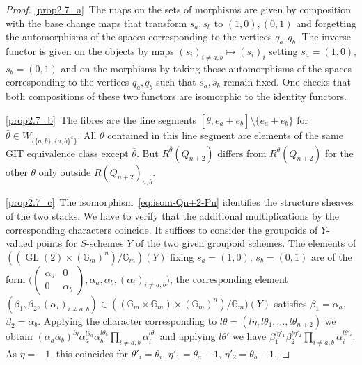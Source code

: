 \documentclass[10pt,a4paper]{amsart}
\theoremstyle{definition}
\def\G{\mathds G}
\DeclareMathOperator{\GL}{GL}
\begin{document}
\begin{proof}
\ref{prop2.7_a}~The maps on the sets of morphisms are given by
composition with the base change maps that transform $s_a,s_b$ to $(1,0),(0,1)$
and forgetting the automorphisms of the spaces corresponding to the vertices $q_a,q_b$.
The inverse functor is given on the objects by maps $(s_i)_{i\neq a,b}\mapsto(s_i)_i$
setting $s_a=(1,0)$, $s_b=(0,1)$ and on the morphisms by taking those
automorphisms of the spaces corresponding to the vertices $q_a,q_b$ such that
$s_a,s_b$ remain fixed. One checks that both compositions of these
two functors are isomorphic to the identity functors.

\ref{prop2.7_b}~The fibres are the line segments $[\bar{\theta},e_a+e_b]\setminus\{e_a+e_b\}$
for $\bar{\theta}\in W_{\{\{a,b\},\{a,b\}^\complement\}}$.
All $\theta$ contained in this line segment are elements of the same GIT equivalence class 
except $\bar{\theta}$. But $R^{\bar{\theta}}(Q_{n+2})$ differs from 
$R^\theta(Q_{n+2})$ for the other $\theta$ only outside $R(Q_{n+2})_{a,b}$.

\ref{prop2.7_c}~The isomorphism~\eqref{eq:isom-Qn+2-Pn} identifies the structure sheaves of the 
two stacks. We have to verify that the additional multiplications by the corresponding 
characters coincide. It suffices to consider the groupoids of $Y$-valued points for 
$S$-schemes $Y$ of the two given groupoid schemes. The elements of 
$((\GL(2)\times(\G_m)^n)/\G_m)(Y)$ fixing $s_a=(1,0)$, $s_b=(0,1)$ are of the 
form $\Big(\left(\begin{smallmatrix}\alpha_a&0\\0&\alpha_b\end{smallmatrix}\right),
\alpha_a,\alpha_b,(\alpha_i)_{i\neq a,b}\Big)$,
the corresponding element
$(\beta_1,\beta_2,(\alpha_i)_{i\neq a,b})\in((\G_m\times\G_m)\times(\G_m)^n)/\G_m)(Y)$ 
satisfies $\beta_1=\alpha_a$, $\beta_2=\alpha_b$.
Applying the character corresponding to 
$l\theta=(l\eta,l\theta_1,\ldots,l\theta_{n+2})$ we obtain
$(\alpha_a\alpha_b)^{l\eta}\alpha_a^{l\theta_a}\alpha_b^{l\theta_b}
\prod_{i\neq a,b}\alpha_i^{l\theta_i}$ and applying $l\theta'$ we have 
$\beta_1^{l\eta'_1}\beta_2^{l\eta'_2}\prod_{i\neq a,b}\alpha_i^{l\theta'_i}$.
As $\eta=-1$, this coincides for $\theta'_i=\theta_i$, $\eta'_1=\theta_a-1$,
$\eta'_2=\theta_b-1$.
\end{proof}

\end{document}
